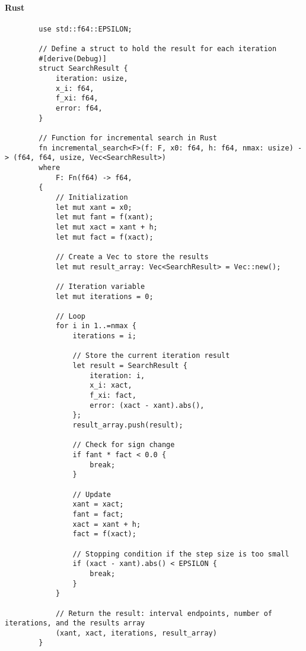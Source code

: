 \documentclass{article}
\begin{document}
    \paragraph{Rust}\label{paragraph:rust}

    \begin{verbatim}
        use std::f64::EPSILON;

        // Define a struct to hold the result for each iteration
        #[derive(Debug)]
        struct SearchResult {
            iteration: usize,
            x_i: f64,
            f_xi: f64,
            error: f64,
        }

        // Function for incremental search in Rust
        fn incremental_search<F>(f: F, x0: f64, h: f64, nmax: usize) -> (f64, f64, usize, Vec<SearchResult>)
        where
            F: Fn(f64) -> f64,
        {
            // Initialization
            let mut xant = x0;
            let mut fant = f(xant);
            let mut xact = xant + h;
            let mut fact = f(xact);

            // Create a Vec to store the results
            let mut result_array: Vec<SearchResult> = Vec::new();

            // Iteration variable
            let mut iterations = 0;

            // Loop
            for i in 1..=nmax {
                iterations = i;

                // Store the current iteration result
                let result = SearchResult {
                    iteration: i,
                    x_i: xact,
                    f_xi: fact,
                    error: (xact - xant).abs(),
                };
                result_array.push(result);

                // Check for sign change
                if fant * fact < 0.0 {
                    break;
                }

                // Update
                xant = xact;
                fant = fact;
                xact = xant + h;
                fact = f(xact);

                // Stopping condition if the step size is too small
                if (xact - xant).abs() < EPSILON {
                    break;
                }
            }

            // Return the result: interval endpoints, number of iterations, and the results array
            (xant, xact, iterations, result_array)
        }
    \end{verbatim}
\end{document}
